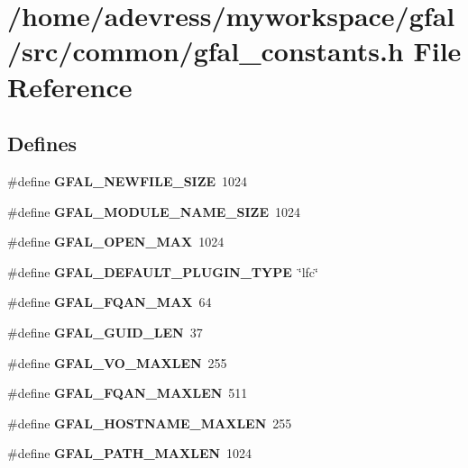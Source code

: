 \section{/home/adevress/myworkspace/gfal/src/common/gfal\_\-constants.h File Reference}
\label{gfal__constants_8h}
\subsection*{Defines}
\begin{CompactItemize}
\item 
\#define \textbf{GFAL\_\-NEWFILE\_\-SIZE}~1024\label{gfal__constants_8h_297519d49026662a60955d6d5e83ffe6}

\item 
\#define \textbf{GFAL\_\-MODULE\_\-NAME\_\-SIZE}~1024\label{gfal__constants_8h_b7ac7a7071265fc62856efb40a9a2f57}

\item 
\#define \textbf{GFAL\_\-OPEN\_\-MAX}~1024\label{gfal__constants_8h_dd3bbae4ae83f55bff1f72071d224f84}

\item 
\#define \textbf{GFAL\_\-DEFAULT\_\-PLUGIN\_\-TYPE}~\char`\"{}lfc\char`\"{}\label{gfal__constants_8h_8ece827a3ec90ab9cbd607bb81ae9f8e}

\item 
\#define \textbf{GFAL\_\-FQAN\_\-MAX}~64\label{gfal__constants_8h_16290fef267c6d4f99d075f869baf36f}

\item 
\#define \textbf{GFAL\_\-GUID\_\-LEN}~37\label{gfal__constants_8h_4e80a5e2ac164a25b36e55d0ce5f5249}

\item 
\#define \textbf{GFAL\_\-VO\_\-MAXLEN}~255\label{gfal__constants_8h_76192327f5c5e09eed57eee3e5386884}

\item 
\#define \textbf{GFAL\_\-FQAN\_\-MAXLEN}~511\label{gfal__constants_8h_6c2fd954a4d022012af906f3889fbe6d}

\item 
\#define \textbf{GFAL\_\-HOSTNAME\_\-MAXLEN}~255\label{gfal__constants_8h_85c450c419c5375c43e92c65a8b0b15c}

\item 
\#define \textbf{GFAL\_\-PATH\_\-MAXLEN}~1024\label{gfal__constants_8h_d523fff3afa4c245c302d8001aea8f9c}


\end{CompactItemize}
